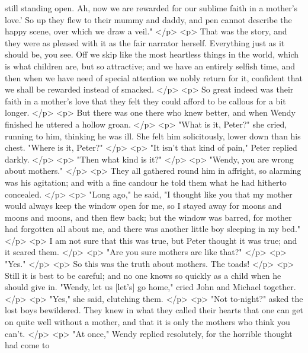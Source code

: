       still standing open. Ah, now we are rewarded for our sublime faith in a
      mother's love.' So up they flew to their mummy and daddy, and pen cannot
      describe the happy scene, over which we draw a veil."
    </p>
    <p>
      That was the story, and they were as pleased with it as the fair narrator
      herself. Everything just as it should be, you see. Off we skip like the
      most heartless things in the world, which is what children are, but so
      attractive; and we have an entirely selfish time, and then when we have
      need of special attention we nobly return for it, confident that we shall
      be rewarded instead of smacked.
    </p>
    <p>
      So great indeed was their faith in a mother's love that they felt they
      could afford to be callous for a bit longer.
    </p>
    <p>
      But there was one there who knew better, and when Wendy finished he
      uttered a hollow groan.
    </p>
    <p>
      "What is it, Peter?" she cried, running to him, thinking he was ill. She
      felt him solicitously, lower down than his chest. "Where is it, Peter?"
    </p>
    <p>
      "It isn't that kind of pain," Peter replied darkly.
    </p>
    <p>
      "Then what kind is it?"
    </p>
    <p>
      "Wendy, you are wrong about mothers."
    </p>
    <p>
      They all gathered round him in affright, so alarming was his agitation;
      and with a fine candour he told them what he had hitherto concealed.
    </p>
    <p>
      "Long ago," he said, "I thought like you that my mother would always keep
      the window open for me, so I stayed away for moons and moons and moons,
      and then flew back; but the window was barred, for mother had forgotten
      all about me, and there was another little boy sleeping in my bed."
    </p>
    <p>
      I am not sure that this was true, but Peter thought it was true; and it
      scared them.
    </p>
    <p>
      "Are you sure mothers are like that?"
    </p>
    <p>
      "Yes."
    </p>
    <p>
      So this was the truth about mothers. The toads!
    </p>
    <p>
      Still it is best to be careful; and no one knows so quickly as a child
      when he should give in. "Wendy, let us [let's] go home," cried John and
      Michael together.
    </p>
    <p>
      "Yes," she said, clutching them.
    </p>
    <p>
      "Not to-night?" asked the lost boys bewildered. They knew in what they
      called their hearts that one can get on quite well without a mother, and
      that it is only the mothers who think you can't.
    </p>
    <p>
      "At once," Wendy replied resolutely, for the horrible thought had come to
